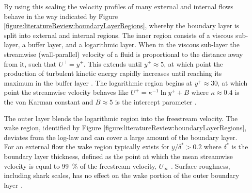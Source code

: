 \documentclass[12pt,oneside,a4paper]{article}
\begin{document}
By using this scaling the velocity profiles of many external and internal flows behave in the way indicated by Figure \ref{figure:literatureReview:boundaryLayerRegions}, whereby the boundary layer is split into external and internal regions. The inner region consists of a viscous sub-layer, a buffer layer, and a logarithmic layer. When in the viscous sub-layer the streamwise (wall-parallel) velocity of a fluid is proportional to the distance away from it, such that $U^+ = y^+$. This extends until $y^+ \approx 5$, at which point the production of turbulent kinetic energy rapidly increases until reaching its maximum in the buffer layer \citep{perlin2016}. The logarithmic region begins at $y^+ \approx 30$, at which point the streamwise velocity behaves like $U^+ = \kappa^{-1} \ln{y^+} + B$ where $\kappa \approx 0.4$ is the von Karman constant and $B\approx 5$ is the intercept parameter \citep{pope2001}.

The outer layer blends the logarithmic region into the freestream velocity. The wake region, identified by Figure \ref{figure:literatureReview:boundaryLayerRegions}, deviates from the log-law and can cover a large amount of the boundary layer. For an external flow the wake region typically exists for $y/\delta^* > 0.2$ where $\delta^*$ is the boundary layer thickness, defined as the point at which the mean streamwise velocity is equal to \SI{99}{\%} of the freestream velocity, $U_\infty$ \citep{pope2001}. Surface roughness, including shark scales, has no effect on the wake portion of the outer boundary layer \citep{flack2010}.
\end{document}
